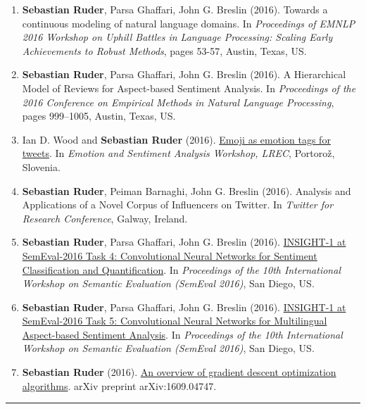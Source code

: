 \documentclass[10pt,letterpaper]{article}
\begin{document}
\begin{enumerate}
	\item \textbf{Sebastian Ruder}, Parsa Ghaffari, John G. Breslin (2016). Towards a continuous modeling of natural language domains. In \textit{Proceedings of EMNLP 2016 Workshop on Uphill Battles in Language Processing: Scaling Early Achievements to Robust Methods}, pages 53-57, Austin, Texas, US.
	
	\item \textbf{Sebastian Ruder}, Parsa Ghaffari, John G. Breslin (2016). A Hierarchical Model of Reviews for Aspect-based Sentiment Analysis. In \textit{Proceedings of the 2016 Conference on Empirical Methods in Natural Language Processing}, pages 999–1005, Austin, Texas, US.
	
	\item Ian D. Wood and \textbf{Sebastian Ruder} (2016). \href{http://gsi.dit.upm.es/esa2016/Proceedings-ESA2016.pdf}{Emoji as emotion tags for tweets}. In \textit{Emotion and Sentiment Analysis Workshop, LREC}, Portorož, Slovenia.
	
	\item \textbf{Sebastian Ruder}, Peiman Barnaghi, John G. Breslin (2016). Analysis and Applications of a Novel Corpus of Influencers on Twitter. In \textit{Twitter for Research Conference}, Galway, Ireland.
	
	\item \textbf{Sebastian Ruder}, Parsa Ghaffari, John G. Breslin (2016). \href{http://www.anthology.aclweb.org/S/S16/S16-1026.pdf}{INSIGHT-1 at SemEval-2016 Task 4: Convolutional Neural Networks for Sentiment Classification and Quantification}. In \textit{Proceedings of the 10th International Workshop on Semantic Evaluation (SemEval 2016)}, San Diego, US.
	
	\item \textbf{Sebastian Ruder}, Parsa Ghaffari, John G. Breslin (2016). \href{http://www.aclweb.org/anthology/S/S16/S16-1053.pdf}{INSIGHT-1 at SemEval-2016 Task 5: Convolutional Neural Networks for Multilingual Aspect-based Sentiment Analysis}. In \textit{Proceedings of the 10th International Workshop on Semantic Evaluation (SemEval 2016)}, San Diego, US.
	
	\item \textbf{Sebastian Ruder} (2016). \href{https://arxiv.org/pdf/1609.04747.pdf}{An overview of gradient descent optimization algorithms}. arXiv preprint arXiv:1609.04747.

\end{enumerate}

\hrule
\vspace{-0.4em}
\end{document}
